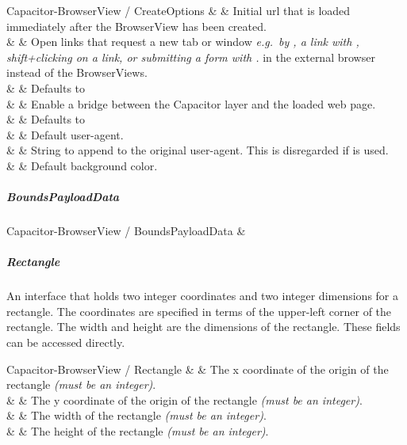 \begin{interfacedesc}{Capacitor-BrowserView / CreateOptions}
                    &    & Initial \ac{url} that is loaded immediately after the BrowserView has been created. \\ \hline
   &   & Open links that request a new tab or window \textit{e.g.\ by , a link with , shift+clicking on a link, or submitting a form with .} in the external browser instead of the BrowserViews. \\
                              &                             & Defaults to  \\ \hline
           &   & Enable a bridge between the Capacitor layer and the loaded web page. \\
                              &                             & Defaults to  \\ \hline
      &    & Default user-agent. \\ \hline
        &    & String to append to the original user-agent. This is disregarded if  is used. \\ \hline
        &     & Default background color. \\ \hline
\end{interfacedesc}

\subparagraph{BoundsPayloadData}

\begin{interface}{Capacitor-BrowserView / BoundsPayloadData}
   &  \\ \hline
\end{interface}

\newpage

\subparagraph{Rectangle}

An interface that holds two integer coordinates and two integer dimensions for a rectangle.
The coordinates are specified in terms of the upper-left corner of the rectangle.
The width and height are the dimensions of the rectangle.
These fields can be accessed directly.

\begin{interfacedesc}{Capacitor-BrowserView / Rectangle}
        &  & The x coordinate of the origin of the rectangle \textit{(must be an integer)}. \\ \hline
        &  & The y coordinate of the origin of the rectangle \textit{(must be an integer)}. \\ \hline
    &  & The width of the rectangle \textit{(must be an integer)}. \\ \hline
   &  & The height of the rectangle \textit{(must be an integer)}. \\ \hline
\end{interfacedesc}

